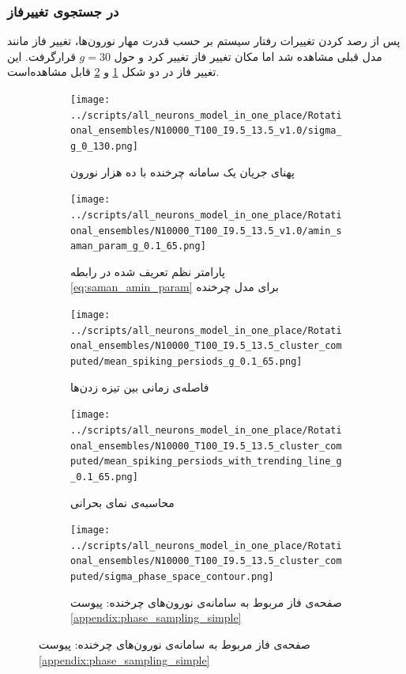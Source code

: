 \subsubsection{در جستجوی تغییرفاز}
پس از رصد کردن تغییرات رفتار سیستم بر حسب قدرت مهار نورون‌ها، تغییر فاز مانند مدل قبلی مشاهده شد اما مکان تغییر فاز تغییر کرد و حول $g=30$ قرارگرفت. این تغییر فاز در دو شکل \ref{fig:sigma_rotational} و \ref{fig:amin_saman_rotational}  قابل مشاهده‌است.
\begin{figure}
	\begin{subfigure}[b]{0.5\textwidth}
	\centering
	\texttt{[image: ../scripts/all\_neurons\_model\_in\_one\_place/Rotational\_ensembles/N10000\_T100\_I9.5\_13.5\_v1.0/sigma\_g\_0\_130.png]}
	\caption{پهنای جریان یک سامانه چرخنده با ده هزار نورون}
	\label{fig:sigma_rotational}
	\end{subfigure}
	\hfill
	\begin{subfigure}[b]{0.5\textwidth}
		\centering
		\texttt{[image: ../scripts/all\_neurons\_model\_in\_one\_place/Rotational\_ensembles/N10000\_T100\_I9.5\_13.5\_v1.0/amin\_saman\_param\_g\_0.1\_65.png]}
		\caption{پارامتر نظم تعریف شده در رابطه \ref{eq:saman_amin_param} برای مدل چرخنده }
		\label{fig:amin_saman_rotational}
	\end{subfigure}
	\hfil
	\begin{subfigure}[b]{0.5\textwidth}
		\centering
		\texttt{[image: ../scripts/all\_neurons\_model\_in\_one\_place/Rotational\_ensembles/N10000\_T100\_I9.5\_13.5\_cluster\_computed/mean\_spiking\_persiods\_g\_0.1\_65.png]}
		\caption{فاصله‌ی زمانی بین تیزه زدن‌ها}
		\label{fig:interspikes_rotational}
	\end{subfigure}
	\hfill
	\begin{subfigure}[b]{0.5\textwidth}
		\centering
		\texttt{[image: ../scripts/all\_neurons\_model\_in\_one\_place/Rotational\_ensembles/N10000\_T100\_I9.5\_13.5\_cluster\_computed/mean\_spiking\_persiods\_with\_trending\_line\_g\_0.1\_65.png]}
		\caption{محاسبه‌ی نمای بحرانی}
		\label{fig:interspikes_rotational_trending_line}
	\end{subfigure}
	\hfill
	\begin{subfigure}[b]{0.5\textwidth}
		\centering
		\texttt{[image: ../scripts/all\_neurons\_model\_in\_one\_place/Rotational\_ensembles/N10000\_T100\_I9.5\_13.5\_cluster\_computed/sigma\_phase\_space\_contour.png]}
		\caption{صفحه‌ی فاز مربوط به سامانه‌ی نورون‌های چرخنده: پیوست \ref{appendix:phase_sampling_simple}}
		\label{fig:rot_g_d_phase_space}
	\end{subfigure}
\end{figure}




